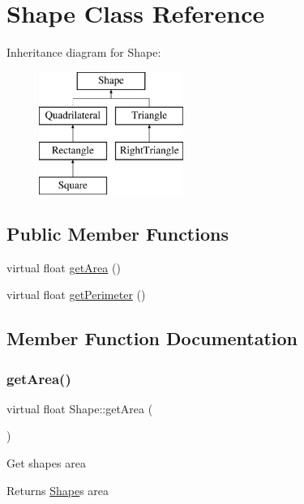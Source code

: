 \hypertarget{class_shape}{}\section{Shape Class Reference}
\label{class_shape}
Inheritance diagram for Shape\+:\begin{figure}[H]
\begin{center}
\leavevmode
\includegraphics[height=4.000000cm]{class_shape}
\end{center}
\end{figure}
\subsection*{Public Member Functions}
\begin{DoxyCompactItemize}
\item 
virtual float \mbox{\hyperlink{class_shape_a90ecb4c7a5c69481145d0d53c6e010ca}{get\+Area}} ()
\item 
virtual float \mbox{\hyperlink{class_shape_a3bf746915187cd97c88b77238093b950}{get\+Perimeter}} ()
\end{DoxyCompactItemize}


\subsection{Member Function Documentation}
\mbox{\label{class_shape_a90ecb4c7a5c69481145d0d53c6e010ca}} 
\subsubsection{\texorpdfstring{get\+Area()}{getArea()}}
{\footnotesize\ttfamily virtual float Shape\+::get\+Area (\begin{DoxyParamCaption}{ }\end{DoxyParamCaption})\hspace{0.3cm}{\ttfamily [virtual]}}

Get shape\textquotesingle{}s area \begin{DoxyReturn}{Returns}
\mbox{\hyperlink{class_shape}{Shape}}\textquotesingle{}s area 
\end{DoxyReturn}


